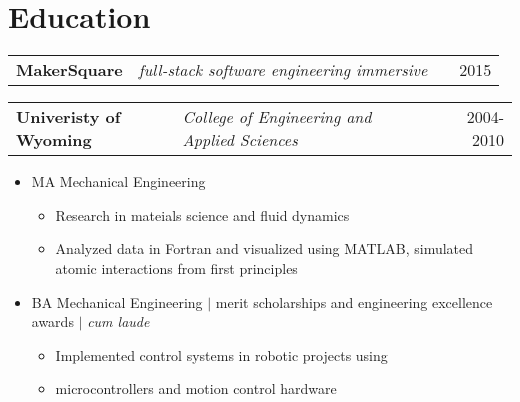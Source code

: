 \documentclass[11pt]{article}
\newenvironment{myitemize}
{ \vspace{-0.5em}
  \begin{itemize}
    \setlength{\itemsep}{-5pt}
    \setlength{\parskip}{0pt}
    \setlength{\parsep}{0pt}
}
{ \end{itemize}
  \vspace{-0.5em}
}
\newcommand*\minitem{
  \vspace{-0.25em}
  \item[$\cdot$]
  \vspace{-0.25em}
}
\newcommand*\majitem{
  \vspace{-0.25em}
  \item[$\circ$]
  \vspace{-0.25em}
}
\begin{document}
\section*{Education}
\begin{tabularx}{\textwidth}{p{5cm} l X r}
  \textbf{MakerSquare} & \emph{full-stack software engineering immersive} & & 2015 \\
\end{tabularx}
\begin{tabularx}{\textwidth}{p{5cm} l X r}
  \textbf{Univeristy of Wyoming} & \emph{College of Engineering and Applied Sciences} & & 2004-2010 \\
\end{tabularx}
\begin{myitemize}%
  \majitem MA Mechanical Engineering \\
  \begin{myitemize}
    \minitem Research in mateials science and fluid dynamics \\
    \minitem Analyzed data in Fortran and visualized using MATLAB, simulated atomic interactions from first principles\\
  \end{myitemize}
  \majitem BA Mechanical Engineering $\vert$ merit scholarships and engineering excellence awards $\vert$ \emph{cum laude} \\
  \begin{myitemize}
    \minitem Implemented control systems in robotic projects using \\
    \minitem microcontrollers and motion control hardware  \\
  \end{myitemize}
\end{myitemize}
\end{document}
